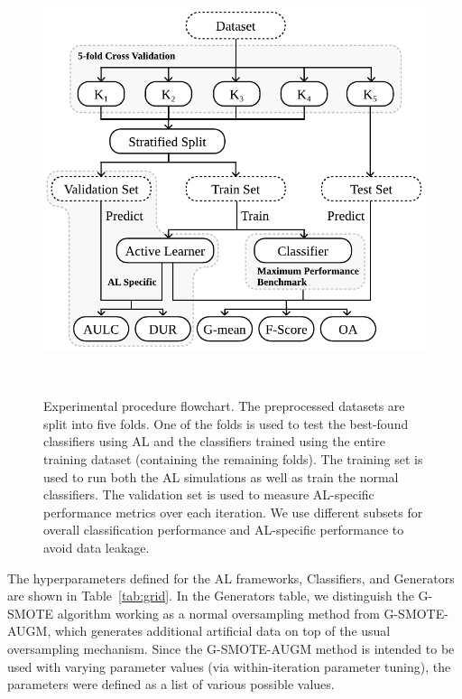 \begin{figure}
	\centering
	\includegraphics[width=.55\linewidth]{experimental_procedure}
    \caption[Experimental procedure flowchart.]{%
        Experimental procedure flowchart. The preprocessed datasets are split
        into five folds. One of the folds is used to test the best-found
        classifiers using AL and the classifiers trained using the entire
        training dataset (containing the remaining folds). The training set is
        used to run both the AL simulations as well as train the normal
        classifiers. The validation set is used to measure AL-specific
        performance metrics over each iteration. We use different subsets for
        overall classification performance and AL-specific performance to
        avoid data leakage.
    }~\label{fig:experimental_procedure}
\end{figure}

The hyperparameters defined for the AL frameworks, Classifiers, and
Generators are shown in Table~\ref{tab:grid}. In the Generators table, we
distinguish the G-SMOTE algorithm working as a normal oversampling method from
G-SMOTE-AUGM, which generates additional artificial data on top of
the usual oversampling mechanism. Since the G-SMOTE-AUGM method is intended to
be used with varying parameter values (via within-iteration parameter tuning),
the parameters were defined as a list of various possible values.

